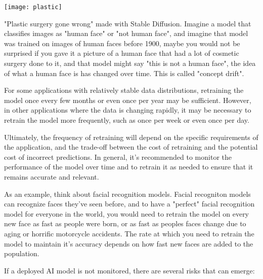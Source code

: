 \begin{marginfigure}[-5.5cm]
        \texttt{[image: plastic]}
        \caption{"Plastic surgery gone wrong" made with Stable Diffusion. Imagine a model that classifies images as "human face" or "not human face", and imagine that model was trained on images of human faces before 1900, maybe you would not be surprised if you gave it a picture of a human face that had a lot of cosmetic surgery done to it, and that model might say "this is not a human face", the idea of what a human face is has changed over time. This is called "concept drift".}
\end{marginfigure}

For some applications with relatively stable data distributions, retraining the model once every few months or even once per year may be sufficient. However, in other applications where the data is changing rapidly, it may be necessary to retrain the model more frequently, such as once per week or even once per day.

Ultimately, the frequency of retraining will depend on the specific requirements of the application, and the trade-off between the cost of retraining and the potential cost of incorrect predictions. In general, it's recommended to monitor the performance of the model over time and to retrain it as needed to ensure that it remains accurate and relevant.

As an example, think about facial recognition models. Facial recogniton models can recognize faces they've seen before, and to have a "perfect" facial recognition model for everyone in the world, you would need to retrain the model on every new face as fast as people were born, or as fast as peoples faces change due to aging or horrific motorcycle accidents. The rate at which you need to retrain the model to maintain it's accuracy depends on how fast new faces are added to the population.

If a deployed AI model is not monitored, there are several risks that can emerge:

